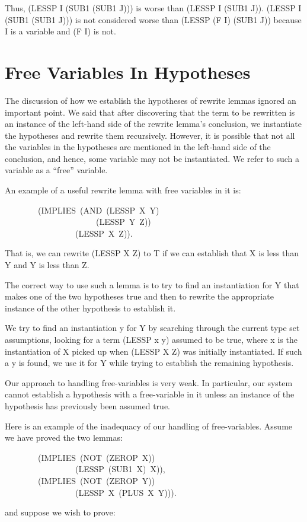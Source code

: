 \documentclass[10pt]{book}
\newenvironment{pubasis}{\begin{flushleft}}{\end{flushleft}}
\begin{document}
Thus, (LESSP I (SUB1 (SUB1 J))) is worse than (LESSP I (SUB1 J)).
(LESSP I (SUB1 (SUB1 J))) is not considered worse than (LESSP (F I) (SUB1 J)) because
I is a variable and (F I) is not.

\section{Free Variables In Hypotheses}
The discussion of how we establish the hypotheses of rewrite lemmas
ignored an important point.   We said that   after discovering
that the
term to be rewritten is an instance of  the left-hand side of the rewrite lemma's
conclusion,  we instantiate the hypotheses
and rewrite them recursively.  However, it is possible that not all the
variables in the hypotheses are mentioned in the left-hand side
of the conclusion, and hence, some variable may not be instantiated.
We refer to such a variable as a ``free'' variable.

An example of a useful rewrite lemma with free variables in it is:

\begin{pubasis}
~~~~~~~~(IMPLIES~(AND~(LESSP~X~Y)\\
~~~~~~~~~~~~~~~~~~~~~~(LESSP~Y~Z))\\
~~~~~~~~~~~~~~~~~(LESSP~X~Z)).\\
\end{pubasis}
That is, we can rewrite (LESSP X Z) to T if we can establish that
X is less than Y and Y is less than Z.

The correct way to use such a lemma is to try to find
an instantiation for Y that makes one of the two hypotheses true and then
to rewrite the appropriate instance
of the other hypothesis to establish it.

We try to find an instantiation y for  Y by searching
through the current type set assumptions, looking for a term
(LESSP x y) assumed to be true, where x is the instantiation of X picked up
when (LESSP X Z) was initially instantiated.
If such a y is found, we use it for Y while trying to establish the
remaining hypothesis.

Our approach to handling free-variables is very weak.  In particular,
our system cannot establish a hypothesis with a free-variable in it unless 
an instance of
the
hypothesis has previously been assumed true.

Here is an example of the inadequacy of our handling of free-variables.
Assume we have proved the two lemmas:
\begin{pubasis}
~~~~~~~~(IMPLIES~(NOT~(ZEROP~X))\\
~~~~~~~~~~~~~~~~~(LESSP~(SUB1~X)~X)),\\

~~~~~~~~(IMPLIES~(NOT~(ZEROP~Y))\\
~~~~~~~~~~~~~~~~~(LESSP~X~(PLUS~X~Y))).\\
\end{pubasis}
and suppose we wish to prove:
\end{document}
